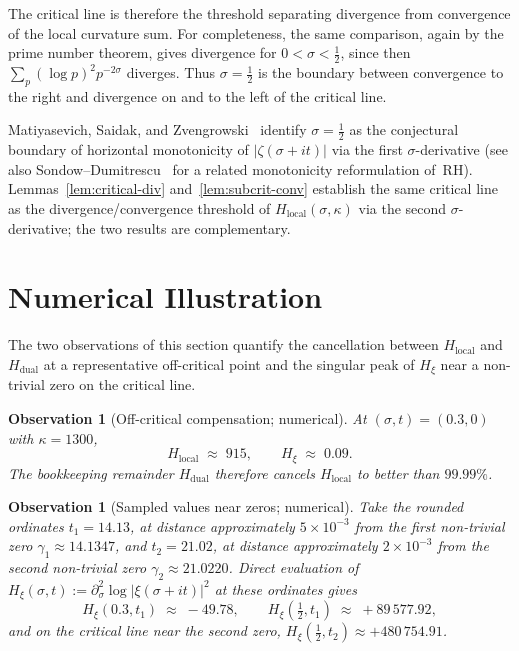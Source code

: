 \documentclass[11pt]{article}
\newtheorem{observation}[theorem]{Observation}
\newcommand{\Hxi}{H_{\xi}}
\newcommand{\Hlocal}{H_{\mathrm{local}}}
\newcommand{\Hdual}{H_{\mathrm{dual}}}
\begin{document}
\medskip
The critical line is therefore the threshold separating
divergence from convergence of the local curvature sum.
For completeness, the same comparison, again
by the prime number theorem, gives divergence for
$0<\sigma<\tfrac12$, since then
$\sum_p(\log p)^2p^{-2\sigma}$ diverges. Thus
$\sigma=\tfrac12$ is the boundary between convergence to the
right and divergence on and to the left of the critical line.

Matiyasevich, Saidak, and Zvengrowski~\cite{MSZ14}
identify $\sigma=\tfrac12$ as the conjectural boundary
of horizontal monotonicity of $\lvert\zeta(\sigma+it)\rvert$
via the first $\sigma$-derivative
(see also Sondow--Dumitrescu~\cite{SondowDumitrescu10}
for a related monotonicity reformulation of~RH).
Lemmas~\ref{lem:critical-div}
and~\ref{lem:subcrit-conv} establish the same critical line
as the divergence/convergence threshold of
$\Hlocal(\sigma,\kappa)$ via the second
$\sigma$-derivative; the two results are complementary.

\section{Numerical Illustration}
\label{sec:numerical}

The two observations of this section quantify the
cancellation between $\Hlocal$ and $\Hdual$ at a
representative off-critical point and the singular peak of
$\Hxi$ near a non-trivial zero on the critical line.

\begin{observation}[Off-critical compensation; numerical]
\label{obs:cancellation}
At $(\sigma,t)=(0.3,0)$ with $\kappa=1300$,
\[
\Hlocal\;\approx\;915,
\qquad
\Hxi\;\approx\;0.09.
\]
The bookkeeping remainder $\Hdual$ therefore cancels $\Hlocal$
to better than $99.99\%$.
\end{observation}

\begin{observation}[Sampled values near zeros; numerical]
\label{obs:peak}
Take the rounded ordinates $t_1=14.13$, at distance
approximately $5\times 10^{-3}$ from the first non-trivial
zero $\gamma_1\approx 14.1347$, and $t_2=21.02$, at distance
approximately $2\times 10^{-3}$ from the second non-trivial
zero $\gamma_2\approx 21.0220$.
Direct evaluation of
$\Hxi(\sigma,t):=\partial_\sigma^{2}\log\lvert\xi(\sigma+it)\rvert^{2}$
at these ordinates gives
\[
\Hxi(0.3,t_1)\;\approx\;-49.78,
\qquad
\Hxi(\tfrac12,t_1)\;\approx\;+89\,577.92,
\]
and on the critical line near the second zero,
$\Hxi(\tfrac12,t_2)\approx +480\,754.91$.
\end{observation}
\end{document}
